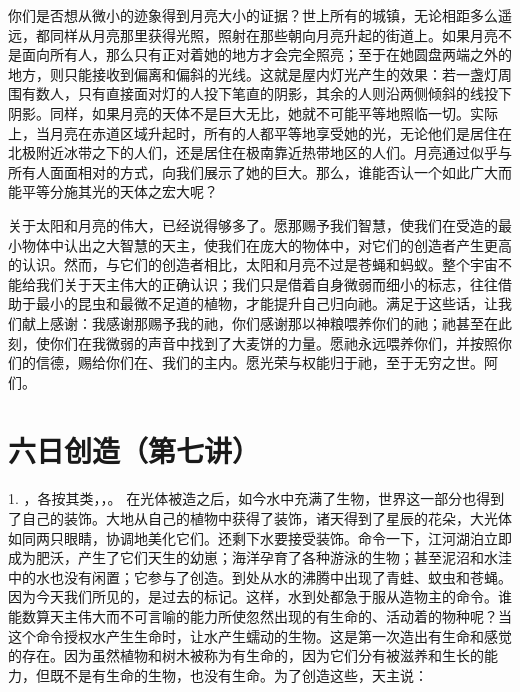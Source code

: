 你们是否想从微小的迹象得到月亮大小的证据？世上所有的城镇，无论相距多么遥远，都同样从月亮那里获得光照，照射在那些朝向月亮升起的街道上。如果月亮不是面向所有人，那么只有正对着她的地方才会完全照亮；至于在她圆盘两端之外的地方，则只能接收到偏离和偏斜的光线。这就是屋内灯光产生的效果：若一盏灯周围有数人，只有直接面对灯的人投下笔直的阴影，其余的人则沿两侧倾斜的线投下阴影。同样，如果月亮的天体不是巨大无比，她就不可能平等地照临一切。实际上，当月亮在赤道区域升起时，所有的人都平等地享受她的光，无论他们是居住在北极附近冰带之下的人们，还是居住在极南靠近热带地区的人们。月亮通过似乎与所有人面面相对的方式，向我们展示了她的巨大。那么，谁能否认一个如此广大而能平等分施其光的天体之宏大呢？\par

关于太阳和月亮的伟大，已经说得够多了。愿那赐予我们智慧，使我们在受造的最小物体中认出之大智慧的天主，使我们在庞大的物体中，对它们的创造者产生更高的认识。然而，与它们的创造者相比，太阳和月亮不过是苍蝇和蚂蚁。整个宇宙不能给我们关于天主伟大的正确认识；我们只是借着自身微弱而细小的标志，往往借助于最小的昆虫和最微不足道的植物，才能提升自己归向祂。满足于这些话，让我们献上感谢：我感谢那赐予我的祂，你们感谢那以神粮喂养你们的祂；祂甚至在此刻，使你们在我微弱的声音中找到了大麦饼的力量。愿祂永远喂养你们，并按照你们的信德，赐给你们在、我们的主内。愿光荣与权能归于祂，至于无穷之世。阿们。\par



\section{六日创造（第七讲）}

\par

1. ，各按其类，，。 在光体被造之后，如今水中充满了生物，世界这一部分也得到了自己的装饰。大地从自己的植物中获得了装饰，诸天得到了星辰的花朵，大光体如同两只眼睛，协调地美化它们。还剩下水要接受装饰。命令一下，江河湖泊立即成为肥沃，产生了它们天生的幼崽；海洋孕育了各种游泳的生物；甚至泥沼和水洼中的水也没有闲置；它参与了创造。到处从水的沸腾中出现了青蛙、蚊虫和苍蝇。因为今天我们所见的，是过去的标记。这样，水到处都急于服从造物主的命令。谁能数算天主伟大而不可言喻的能力所使忽然出现的有生命的、活动着的物种呢？当这个命令授权水产生生命时，让水产生蠕动的生物。这是第一次造出有生命和感觉的存在。因为虽然植物和树木被称为有生命的，因为它们分有被滋养和生长的能力，但既不是有生命的生物，也没有生命。为了创造这些，天主说：\par

